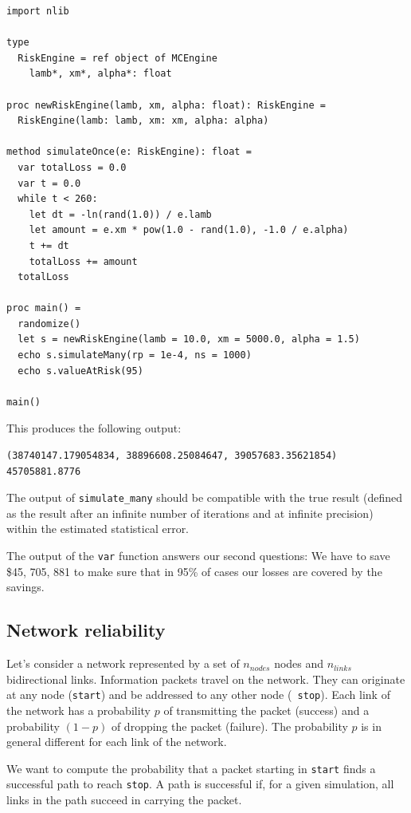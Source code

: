 \documentclass[justified, sixbynine]{tufte-book}
\def\ft{\small\tt}
\theoremstyle{plain}%
\newtheorem * {corollary}{Corollary}
\theoremstyle{definition}
\theoremstyle{remark}
\newtheorem * {remark}{Remark}
\newtheorem * {note}{Note}
\begin{document}
\begin{fullwidth}
\begin{lstlisting}[caption={in file: {\ft risk.nim}}]
import nlib

type
  RiskEngine = ref object of MCEngine
    lamb*, xm*, alpha*: float

proc newRiskEngine(lamb, xm, alpha: float): RiskEngine =
  RiskEngine(lamb: lamb, xm: xm, alpha: alpha)

method simulateOnce(e: RiskEngine): float =
  var totalLoss = 0.0
  var t = 0.0
  while t < 260:
    let dt = -ln(rand(1.0)) / e.lamb
    let amount = e.xm * pow(1.0 - rand(1.0), -1.0 / e.alpha)
    t += dt
    totalLoss += amount
  totalLoss

proc main() =
  randomize()
  let s = newRiskEngine(lamb = 10.0, xm = 5000.0, alpha = 1.5)
  echo s.simulateMany(rp = 1e-4, ns = 1000)
  echo s.valueAtRisk(95)

main()
\end{lstlisting}

This produces the following output:

\begin{lstlisting}
(38740147.179054834, 38896608.25084647, 39057683.35621854)
45705881.8776
\end{lstlisting}

The output of {\ft simulate\_many} should be compatible with the true result (defined as the result after an infinite number of iterations and at infinite precision) within the estimated statistical error.

The output of the {\ft var} function answers our second questions: We have to save \$45, 705, 881 to make sure that in 95\% of cases our losses are covered by the savings.

\subsection{Network reliability}

Let's consider a network represented by a set of $n_{nodes}$ nodes and $%
n_{links}$ bidirectional links. Information
packets travel on the network. They can
originate at any node ({\ft start}) and be addressed to any other node ({\ft %
stop}). Each link of the network has a probability $p$ of transmitting the
packet (success) and a probability $(1-p)$ of dropping the packet (failure).
The probability $p$ is in general different for each link of the network.

We want to compute the probability that a packet
starting in {\ft start} finds a successful path to reach {\ft stop}. A path
is successful if, for a given simulation, all links in the path succeed in
carrying the packet.


\end{fullwidth}
\end{document}
